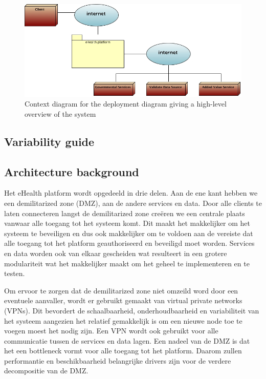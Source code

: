 \documentclass[a4paper,10pt]{article}
\begin{document}
\begin{figure}[!h]
  \includegraphics[width=\textwidth]{../images/deployment_DMZ_context.jpg}
    \caption{Context diagram for the deployment diagram giving a high-level overview of the system}
\end{figure}

\subsection{Variability guide}

\subsection{Architecture background}

Het eHealth platform wordt opgedeeld in drie delen. Aan de ene kant hebben we een demilitarized zone (DMZ), aan de andere services en data. Door alle clients te laten connecteren langst de demilitarized zone creëren we een centrale plaats vanwaar alle toegang tot het systeem komt. Dit maakt het makkelijker om het systeem te beveiligen en dus ook makkelijker om te voldoen aan de vereiste dat alle toegang tot het platform geauthoriseerd en beveiligd moet worden. Services en data worden ook van elkaar gescheiden wat resulteert in een grotere modulariteit wat het makkelijker maakt om het geheel te implementeren en te testen.

Om ervoor te zorgen dat de demilitarized zone niet omzeild word door een eventuele aanvaller, wordt er gebruikt gemaakt van virtual private networks (VPNs). Dit bevordert de schaalbaarheid, onderhoudbaarheid en variabiliteit van het systeem aangezien het relatief gemakkelijk is om een nieuwe node toe te voegen moest het nodig zijn. Een VPN wordt ook gebruikt voor alle communicatie tussen de services en data lagen. Een nadeel van de DMZ is dat het een bottleneck vormt voor alle toegang tot het platform. Daarom zullen performantie en beschikbaarheid belangrijke drivers zijn voor de verdere decompositie van de DMZ.
\end{document}
